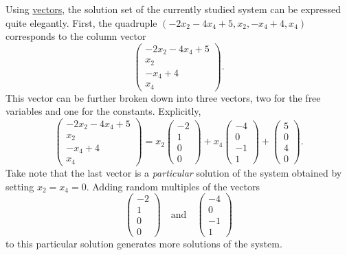 Using \hyperref[def:vector]{vectors}, the solution set of the currently studied
system can be expressed quite elegantly. First, the quadruple $(-2x_2 - 4x_4 +
5, x_2,-x_4 + 4,x_4)$ corresponds to the column vector
\[
 \begin{pmatrix}
  -2x_2 - 4x_4 + 5\\
  x_2\\
  -x_4 + 4\\
  x_4
 \end{pmatrix}.
\]
This vector can be further broken down into three vectors, two for the free
variables and one for the constants. Explicitly,
\[
 \begin{pmatrix}
  -2x_2 - 4x_4 + 5\\
  x_2\\
  -x_4 + 4\\
  x_4
 \end{pmatrix} = x_2
 \begin{pmatrix}
  -2\\
  1\\
  0\\
  0
 \end{pmatrix} + x_4
 \begin{pmatrix}
  -4\\
  0\\
  -1\\
  1
 \end{pmatrix} + 
 \begin{pmatrix}
  5\\
  0\\
  4\\
  0
 \end{pmatrix}.
\]
Take note that the last vector is a \emph{particular} solution of the system
obtained by setting $x_2 = x_4 = 0$. Adding random multiples of the vectors
\[
 \begin{pmatrix}
  -2\\
  1\\
  0\\
  0
 \end{pmatrix} \quad \text{and} \quad 
 \begin{pmatrix}
  -4\\
  0\\
  -1\\
  1
 \end{pmatrix}
\]
to this particular solution generates more solutions of the system.

